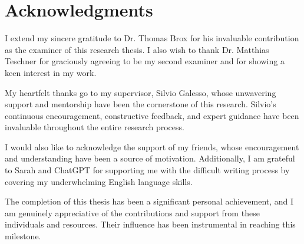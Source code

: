 \chapter{Acknowledgments}
I extend my sincere gratitude to Dr. Thomas Brox for his invaluable contribution as the examiner of this research thesis. I also wish to thank Dr. Matthias Teschner for graciously agreeing to be my second examiner and for showing a keen interest in my work.

My heartfelt thanks go to my supervisor, Silvio Galesso, whose unwavering support and mentorship have been the cornerstone of this research. Silvio's continuous encouragement, constructive feedback, and expert guidance have been invaluable throughout the entire research process.

I would also like to acknowledge the support of my friends, whose encouragement and understanding have been a source of motivation. Additionally, I am grateful to Sarah and ChatGPT for supporting me with the difficult writing process by covering my underwhelming English language skills.

The completion of this thesis has been a significant personal achievement, and I am genuinely appreciative of the contributions and support from these individuals and resources. Their influence has been instrumental in reaching this milestone.
